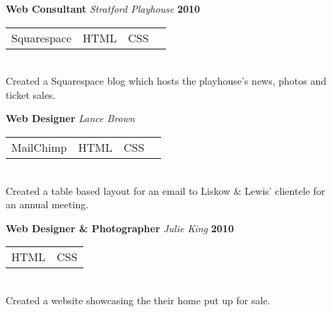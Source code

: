 \documentclass[margin,line]{res}
\begin{document}
{\begin{resume}

{\bf Web Consultant} {\em Stratford Playhouse} \hfill {\bf 2010} \
\\
\begin{tabular}{l l l l}
   Squarespace  &  HTML &  CSS
\end{tabular}
\\
Created a Squarespace blog which hosts the playhouse's news,
photos and \\ ticket sales.
\vspace{-.13in}


{\bf Web Designer} {\em Lance Brown} \hfill %
\\
\begin{tabular}{l l l l}
     MailChimp &  HTML &  CSS
\end{tabular}
\\
Created a table based layout for an email to Liskow \& Lewis'
clientele for \\ an annual meeting.
\vspace{-.13in}


{\bf Web Designer \& Photographer} {\em Julie King} \hfill {\bf 2010} \
\\
\begin{tabular}{l l}
   HTML &  CSS
\end{tabular}
\\
Created a website showcasing the their home put up for sale.
\vspace{-.13in}


\end{resume}}
\end{document}
